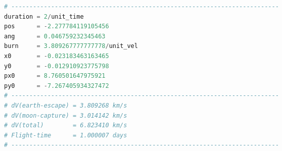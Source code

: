 \begin{adjustwidth*}{0cm}{-0.4cm}
\begin{lstlisting}[language=Python,caption=Fast duration Hohmann]
# --------------------------------------------------------------------------
duration = 2/unit_time
pos      = -2.277784119105456
ang      = 0.046759232345463
burn     = 3.809267777777778/unit_vel
x0       = -0.023183463163465
y0       = -0.012910923775798
px0      = 8.760501647975921
py0      = -7.267405934327472
# --------------------------------------------------------------------------
# dV(earth-escape) = 3.809268 km/s
# dV(moon-capture) = 3.014142 km/s
# dV(total)        = 6.823410 km/s
# Flight-time      = 1.000007 days
# --------------------------------------------------------------------------
\end{lstlisting}
\end{adjustwidth*}